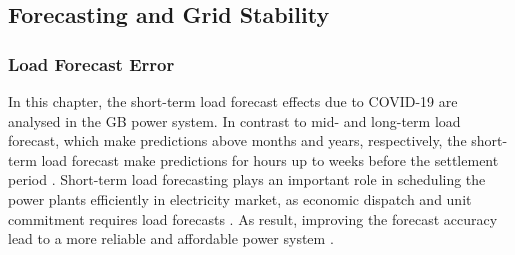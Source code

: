 \documentclass[energies,article,submit,moreauthors,pdftex]{Definitions/mdpi}
\begin{document}



\subsection{Forecasting and Grid Stability}
\subsubsection{Load Forecast Error}\label{DemandForecastError}
In this chapter, the short-term load forecast effects due to COVID-19 are analysed in the GB power system. In contrast to mid- and long-term load forecast, which make predictions above months and years, respectively, the short-term load forecast make predictions for hours up to weeks before the settlement period \cite{SahayDayNetwork,Khuntia2016ForecastingReview}. Short-term load forecasting plays an important role in scheduling the power plants efficiently in electricity market, as economic dispatch and unit commitment requires load forecasts \cite{He2020Day-aheadForest}. As result, improving the forecast accuracy lead to a more reliable and affordable power system \cite{SahayDayNetwork}. 
\end{document}
